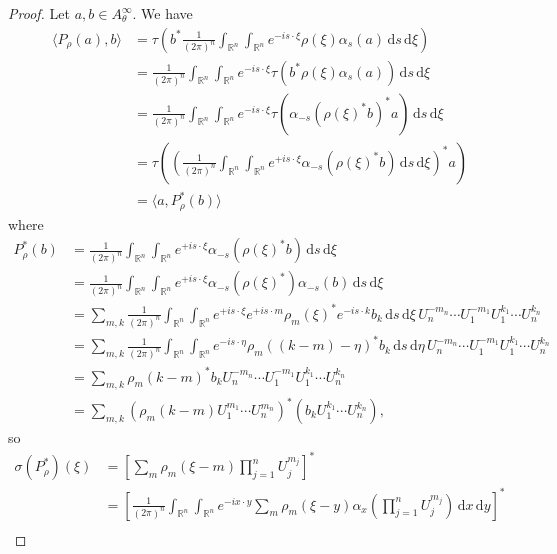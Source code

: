 \documentclass[10pt]{article}
\theoremstyle{remark}
\theoremstyle{definition}
\begin{document}
\begin{proof}
Let $a,b\in A_{\theta}^{\infty}$.
We have
\begin{align*}
\langle P_{\rho}(a),b\rangle
&= \tau\left(b^*\frac{1}{(2\pi)^n}\int_{\mathbb R^n}\!\int_{\mathbb R^n}\!
e^{-is\cdot\xi}\rho(\xi)\alpha_s(a)\,\mathrm ds\,\mathrm d\xi\right) \\
&= \frac{1}{(2\pi)^n}\int_{\mathbb R^n}\!\int_{\mathbb R^n}\!
e^{-is\cdot\xi}\tau(b^*\rho(\xi)\alpha_s(a))\,\mathrm ds\,\mathrm d\xi \\
&= \frac{1}{(2\pi)^n}\int_{\mathbb R^n}\!\int_{\mathbb R^n}\!e^{-is\cdot\xi}
\tau(\alpha_{-s}(\rho(\xi)^*b)^*a)\,\mathrm ds\,\mathrm d\xi \\
&= \tau\left(\left(\frac{1}{(2\pi)^n}\int_{\mathbb R^n}\!
\int_{\mathbb R^n}\!e^{+is\cdot\xi}
\alpha_{-s}(\rho(\xi)^*b)\,\mathrm ds\,\mathrm d\xi\right)^*a\right) \\
&= \langle a,P_{\rho}^*(b)\rangle
\end{align*}
where
\begin{align*}
P_{\rho}^*(b) &= \frac{1}{(2\pi)^n}\int_{\mathbb R^n}\!\int_{\mathbb R^n}\!
e^{+is\cdot\xi}\alpha_{-s}(\rho(\xi)^*b)\,\mathrm ds\,\mathrm d\xi \\
&= \frac{1}{(2\pi)^n}\int_{\mathbb R^n}\!\int_{\mathbb R^n}\!e^{+is\cdot\xi}
\alpha_{-s}(\rho(\xi)^*)\alpha_{-s}(b)\,\mathrm ds\,\mathrm d\xi \\
&= \sum_{m,k}\frac{1}{(2\pi)^n}\int_{\mathbb R^n}\int_{\mathbb R^n}
e^{+is\cdot\xi}e^{+is\cdot m}\rho_m(\xi)^*e^{-is\cdot k}b_k
\,\mathrm ds\,\mathrm d\xi\,U_n^{-m_n}\cdots U_1^{-m_1}
U_1^{k_1}\cdots U_n^{k_n} \\
&= \sum_{m,k}\frac{1}{(2\pi)^n}\int_{\mathbb R^n}\int_{\mathbb R^n}
e^{-is\cdot\eta}\rho_m((k-m)-\eta)^*b_k
\,\mathrm ds\,\mathrm d\eta\,U_n^{-m_n}\cdots U_1^{-m_1}
U_1^{k_1}\cdots U_n^{k_n} \\
&= \sum_{m,k}\rho_m(k-m)^*b_k
U_n^{-m_n}\cdots U_1^{-m_1}U_1^{k_1}\cdots U_n^{k_n} \\
&= \sum_{m,k}(\rho_m(k-m)U_1^{m_1}\cdots U_n^{m_n})^*
(b_kU_1^{k_1}\cdots U_n^{k_n}),
\end{align*}
so 
\begin{align*}
\sigma(P_{\rho}^*)(\xi)
&= \left[\sum_m\rho_m(\xi-m)\prod_{j=1}^nU_j^{m_j}\right]^* \\
&= \left[\frac{1}{(2\pi)^n}\int_{\mathbb R^n}\!\int_{\mathbb R^n}\!
e^{-ix\cdot y}\sum_m\rho_m(\xi-y)\alpha_x\left(\prod_{j=1}^nU_j^{m_j}\right)
\,\mathrm dx\,\mathrm dy\right]^* \\

\end{align*}
\end{proof}
\end{document}
